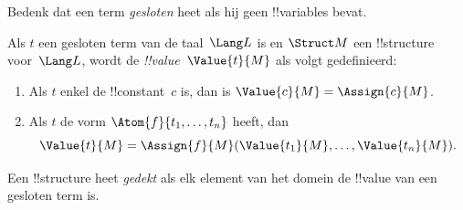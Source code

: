 \documentclass[../../../include/open-logic-section]{subfiles}
\begin{document}


\begin{explain}
Bedenk dat een term \emph{gesloten} heet als hij geen !!{variable}s bevat.
\end{explain}

\begin{defn}
Als $t$ een gesloten term van de taal~$\Lang L$ is en $\Struct M$ een
!!{structure} voor~$\Lang L$, wordt de \emph{!!{value}}~$\Value{t}{M}$
als volgt gedefinieerd:
\begin{enumerate}
\item Als $t$ enkel de !!{constant}~$c$ is, dan is $\Value{c}{M} = \Assign{c}{M}$.
\item Als $t$ de vorm $\Atom{f}{t_1, \ldots, t_n}$ heeft, dan
  \[
  \Value{t}{M} = \Assign{f}{M}(\Value{t_1}{M}, \ldots,
  \Value{t_n}{M}).
  \]
\end{enumerate}
\end{defn}

\begin{defn}
Een !!{structure} heet \emph{gedekt} als elk element van het domein de
!!{value} van een gesloten term is.
\end{defn}
\end{document}
